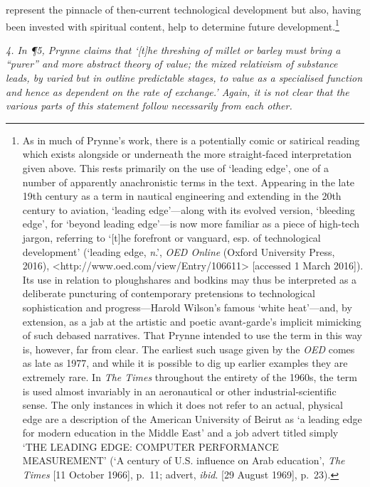 \documentclass[]{article}
\begin{document}
represent the pinnacle of then-current technological development but
also, having been invested with spiritual content, help to determine
future development.\footnote{As in much of Prynne's work, there is a
  potentially comic or satirical reading which exists alongside or
  underneath the more straight-faced interpretation given above. This
  rests primarily on the use of `leading edge', one of a number of
  apparently anachronistic terms in the text. Appearing in the late 19th
  century as a term in nautical engineering and extending in the 20th
  century to aviation, `leading edge'---along with its evolved version,
  `bleeding edge', for `beyond leading edge'---is now more familiar as a
  piece of high-tech jargon, referring to `{[}t{]}he forefront or
  vanguard, esp. of technological development' (`leading edge,
  \emph{n}.', \emph{OED Online} (Oxford University Press, 2016),
  \textless{}http://www.oed.com/view/Entry/106611\textgreater{}
  {[}accessed 1 March 2016{]}). Its use in relation to ploughshares and
  bodkins may thus be interpreted as a deliberate puncturing of
  contemporary pretensions to technological sophistication and
  progress---Harold Wilson's famous `white heat'---and, by extension, as
  a jab at the artistic and poetic avant-garde's implicit mimicking of
  such debased narratives. That Prynne intended to use the term in this
  way is, however, far from clear. The earliest such usage given by the
  \emph{OED} comes as late as 1977, and while it is possible to dig up
  earlier examples they are extremely rare. In \emph{The Times}
  throughout the entirety of the 1960s, the term is used almost
  invariably in an aeronautical or other industrial-scientific sense.
  The only instances in which it does not refer to an actual, physical
  edge are a description of the American University of Beirut as `a
  leading edge for modern education in the Middle East' and a job advert
  titled simply `THE LEADING EDGE: \textbar{} COMPUTER PERFORMANCE
  MEASUREMENT' (`A century of U.S. influence on Arab education',
  \emph{The Times} {[}11 October 1966{]}, p.~11; advert, \emph{ibid}.
  {[}29 August 1969{]}, p.~23).}

\emph{4. In ¶5, Prynne claims that `{[}t{]}he threshing of millet or
barley must bring a ``purer'' and more abstract theory of value; the
mixed relativism of substance leads, by varied but in outline
predictable stages, to value as a specialised function and hence as
dependent on the rate of exchange.' Again, it is not clear that the
various parts of this statement follow necessarily from each other.}
\end{document}
